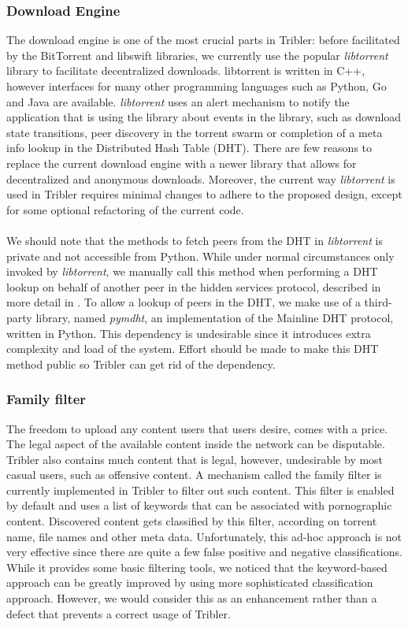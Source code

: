 \subsubsection{\textbf{Download Engine}}
The download engine is one of the most crucial parts in Tribler: before facilitated by the BitTorrent and libswift libraries, we currently use the popular \emph{libtorrent} library to facilitate decentralized downloads. libtorrent is written in C++, however interfaces for many other programming languages such as Python, Go and Java are available. \emph{libtorrent} uses an alert mechanism to notify the application that is using the library about events in the library, such as download state transitions, peer discovery in the torrent swarm or completion of a meta info lookup in the Distributed Hash Table (DHT). There are few reasons to replace the current download engine with a newer library that allows for decentralized and anonymous downloads. Moreover, the current way \emph{libtorrent} is used in Tribler requires minimal changes to adhere to the proposed design, except for some optional refactoring of the current code.\\\\
We should note that the methods to fetch peers from the DHT in \emph{libtorrent} is private and not accessible from Python. While under normal circumstances only invoked by \emph{libtorrent}, we manually call this method when performing a DHT lookup on behalf of another peer in the hidden services protocol, described in more detail in \cite{ruigrok2015bittorrent}. To allow a lookup of peers in the DHT, we make use of a third-party library, named \emph{pymdht}, an implementation of the Mainline DHT protocol, written in Python. This dependency is undesirable since it introduces extra complexity and load of the system. Effort should be made to make this DHT method public so Tribler can get rid of the dependency.

\subsubsection{\textbf{Family filter}}
The freedom to upload any content users that users desire, comes with a price. The legal aspect of the available content inside the network can be disputable. Tribler also contains much content that is legal, however, undesirable by most casual users, such as offensive content. A mechanism called the family filter is currently implemented in Tribler to filter out such content. This filter is enabled by default and uses a list of keywords that can be associated with pornographic content. Discovered content gets classified by this filter, according on torrent name, file names and other meta data. Unfortunately, this ad-hoc approach is not very effective since there are quite a few false positive and negative classifications. While it provides some basic filtering tools, we noticed that the keyword-based approach can be greatly improved by using more sophisticated classification approach. However, we would consider this as an enhancement rather than a defect that prevents a correct usage of Tribler.

